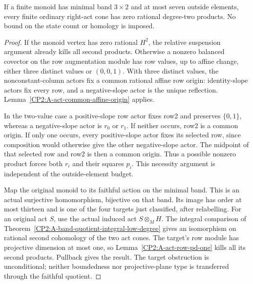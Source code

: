 \begin{theorem}
\label{CP2:A-three-row-seven-outside-acts}
If a finite monoid has minimal band $3\times2$ and at most seven
outside elements, every finite ordinary right-act cone has zero
rational degree-two products. No bound on the state count or
homology is imposed.
\end{theorem}
\begin{proof}
If the monoid vertex has zero rational $H^2$, the relative
suspension argument already kills all second products. Otherwise
a nonzero balanced covector on the row augmentation module has
row values, up to affine change, either three distinct values
or $(0,0,1)$. With three distinct values, the nonconstant-column
actors fix a common rational affine row origin: identity-slope
actors fix every row, and a negative-slope actor is the unique
reflection. Lemma~\ref{CP2:A-act-common-affine-origin} applies.

In the two-value case a positive-slope row actor fixes row2 and
preserves $\{0,1\}$, whereas a negative-slope actor is $r_0$ or
$r_1$. If neither occurs, row2 is a common origin. If only one
occurs, every positive-slope actor fixes its selected row, since
composition would otherwise give the other negative-slope actor.
The midpoint of that selected row and row2 is then a common
origin. Thus a possible nonzero product forces both $r_i$ and
their squares $p_i$. This necessity argument is independent of
the outside-element budget.

Map the original monoid to its faithful action on the minimal
band. This is an actual surjective homomorphism, bijective on
that band. Its image has order at most thirteen and is one of
the four targets just classified, after relabelling. For an
original act $S$, use the actual induced act $S\otimes_M H$.
The integral comparison of
Theorem~\ref{CP2:A-band-quotient-integral-low-degree} gives an
isomorphism on rational second cohomology of the two act cones.
The target's row module has projective dimension at most one,
so Lemma~\ref{CP2:A-act-row-pd-one} kills all its second products.
Pullback gives the result. The target obstruction is unconditional;
neither boundedness nor projective-plane type is transferred through
the faithful quotient.
\end{proof}
